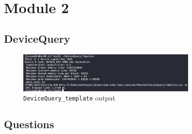 \documentclass[../main.tex]{subfiles}
\begin{document}
\pagestyle{fancy}

\section{Module 2}

\subsection*{DeviceQuery}

\begin{figure}
    [ht]
    \centering
    \includegraphics[width=0.8\textwidth]{devicequery.png}
    \caption{\texttt{DeviceQuery\_template} output}
\end{figure}

\subsection*{Questions}
\end{document}

